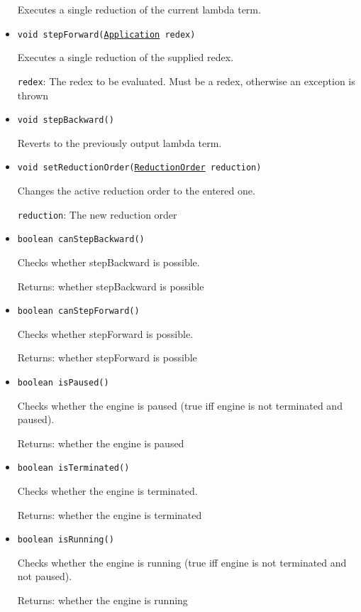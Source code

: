 \begin{itemize}
Executes a single reduction of the current lambda term.

\item \texttt{void stepForward(\hyperref[type:edu.kit.wavelength.client.model.term.Application]{Application} redex)}

Executes a single reduction of the supplied redex.

\texttt{redex}: The redex to be evaluated. Must be a redex, otherwise an exception
            is thrown

\item \texttt{void stepBackward()}

Reverts to the previously output lambda term.

\item \texttt{void setReductionOrder(\hyperref[type:edu.kit.wavelength.client.model.reduction.ReductionOrder]{ReductionOrder} reduction)}

Changes the active reduction order to the entered one.

\texttt{reduction}: The new reduction order

\item \texttt{boolean canStepBackward()}

Checks whether stepBackward is possible.

Returns: whether stepBackward is possible

\item \texttt{boolean canStepForward()}

Checks whether stepForward is possible.

Returns: whether stepForward is possible

\item \texttt{boolean isPaused()}

Checks whether the engine is paused (true iff engine is not terminated and
 paused).

Returns: whether the engine is paused

\item \texttt{boolean isTerminated()}

Checks whether the engine is terminated.

Returns: whether the engine is terminated

\item \texttt{boolean isRunning()}

Checks whether the engine is running (true iff engine is not terminated and
 not paused).

Returns: whether the engine is running


\end{itemize}
